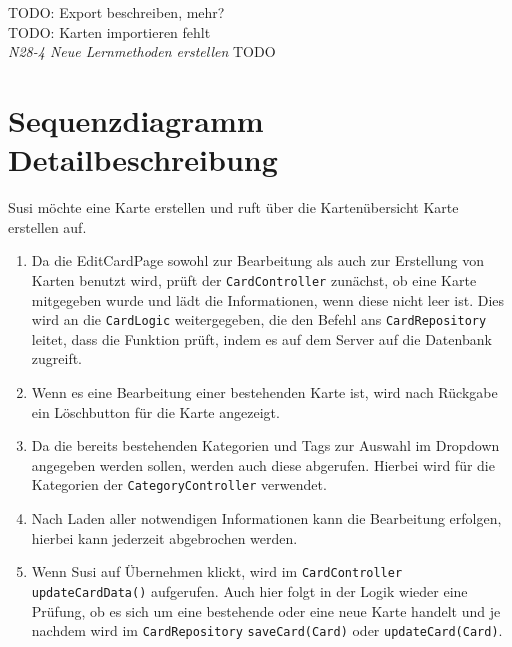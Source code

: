 \documentclass[fontsize=12pt,paper=A4,twoside]{scrartcl}
\begin{document}
    TODO: Export beschreiben, mehr?\\
    TODO: Karten importieren fehlt\\
    \textit{N28-4 Neue Lernmethoden erstellen} TODO
    \section{Sequenzdiagramm Detailbeschreibung}
    Susi möchte eine Karte erstellen und ruft über die Kartenübersicht Karte erstellen auf.\\
    \begin{enumerate}
    \item Da die EditCardPage sowohl zur Bearbeitung als auch zur Erstellung von Karten benutzt wird, prüft der \texttt{CardController}
    zunächst, ob eine Karte mitgegeben wurde und lädt die Informationen, wenn diese nicht leer ist. Dies wird an die \texttt{CardLogic} weitergegeben, die 
    den Befehl ans \texttt{CardRepository} leitet, dass die Funktion prüft, indem es auf dem Server auf die Datenbank zugreift.
    \item Wenn es eine Bearbeitung einer bestehenden Karte ist, wird nach Rückgabe ein Löschbutton für die Karte angezeigt.
    \item Da die bereits bestehenden Kategorien und Tags zur Auswahl im Dropdown angegeben werden sollen, werden auch diese abgerufen.
    Hierbei wird für die Kategorien der \texttt{CategoryController} verwendet.
    \item Nach Laden aller notwendigen Informationen kann die Bearbeitung erfolgen, hierbei kann jederzeit abgebrochen werden.
    \item Wenn Susi auf Übernehmen klickt, wird im \texttt{CardController} \texttt{updateCardData()} aufgerufen. Auch hier folgt
    in der Logik wieder eine Prüfung, ob es sich um eine bestehende oder eine neue Karte handelt und je nachdem wird im \texttt{CardRepository}
    \texttt{saveCard(Card)} oder \texttt{updateCard(Card)}.
    \end{enumerate}

    



   
     \newpage
    \recalctypearea

    \thispagestyle{empty}
    \begin{tikzpicture}%
        
    \end{tikzpicture}
    \newpage
    \thispagestyle{empty}
    \begin{tikzpicture}%
        
    \end{tikzpicture}
    \newpage
\end{document}
